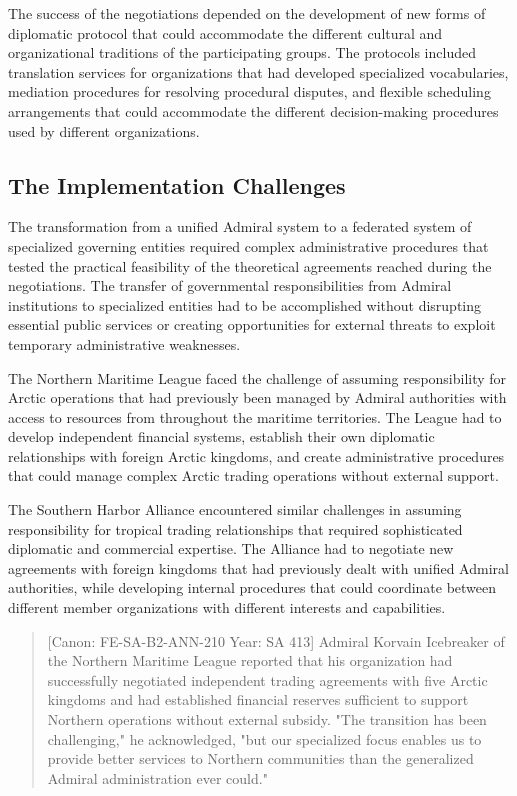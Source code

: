 The success of the negotiations depended on the development of new forms
of diplomatic protocol that could accommodate the different cultural and
organizational traditions of the participating groups. The protocols
included translation services for organizations that had developed
specialized vocabularies, mediation procedures for resolving procedural
disputes, and flexible scheduling arrangements that could accommodate
the different decision-making procedures used by different
organizations.

\subsection{The Implementation
Challenges}\label{the-implementation-challenges}

The transformation from a unified Admiral system to a federated system
of specialized governing entities required complex administrative
procedures that tested the practical feasibility of the theoretical
agreements reached during the negotiations. The transfer of governmental
responsibilities from Admiral institutions to specialized entities had
to be accomplished without disrupting essential public services or
creating opportunities for external threats to exploit temporary
administrative weaknesses.

The Northern Maritime League faced the challenge of assuming
responsibility for Arctic operations that had previously been managed by
Admiral authorities with access to resources from throughout the
maritime territories. The League had to develop independent financial
systems, establish their own diplomatic relationships with foreign
Arctic kingdoms, and create administrative procedures that could manage
complex Arctic trading operations without external support.

The Southern Harbor Alliance encountered similar challenges in assuming
responsibility for tropical trading relationships that required
sophisticated diplomatic and commercial expertise. The Alliance had to
negotiate new agreements with foreign kingdoms that had previously dealt
with unified Admiral authorities, while developing internal procedures
that could coordinate between different member organizations with
different interests and capabilities.

\begin{quote}
{[}Canon: FE-SA-B2-ANN-210 \textbar{} Year: SA 413{]} Admiral Korvain
Icebreaker of the Northern Maritime League reported that his
organization had successfully negotiated independent trading agreements
with five Arctic kingdoms and had established financial reserves
sufficient to support Northern operations without external subsidy. "The
transition has been challenging," he acknowledged, "but our specialized
focus enables us to provide better services to Northern communities than
the generalized Admiral administration ever could."
\end{quote}


